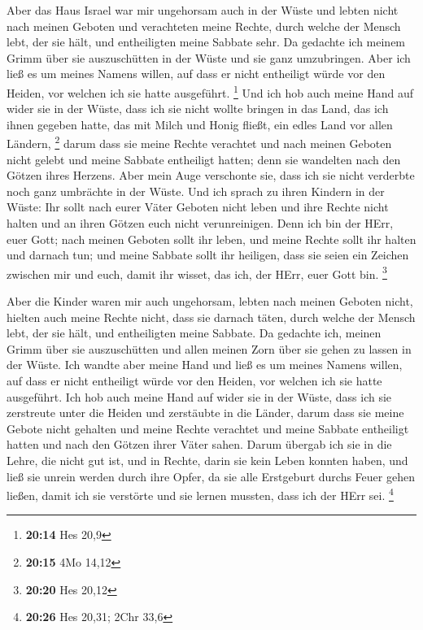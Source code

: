  Aber das Haus Israel war mir ungehorsam auch in der Wüste
und lebten nicht nach meinen Geboten und verachteten meine Rechte, durch
welche der Mensch lebt, der sie hält, und entheiligten meine Sabbate
sehr. Da gedachte ich meinem Grimm über sie auszuschütten in der Wüste
und sie ganz umzubringen.  Aber ich ließ es um meines
Namens willen, auf dass er nicht entheiligt würde vor den Heiden, vor
welchen ich sie hatte ausgeführt. \footnote{\textbf{20:14} Hes 20,9}
 Und ich hob auch meine Hand auf wider sie in der Wüste,
dass ich sie nicht wollte bringen in das Land, das ich ihnen gegeben
hatte, das mit Milch und Honig fließt, ein edles Land vor allen Ländern,
\footnote{\textbf{20:15} 4Mo 14,12}  darum dass sie meine
Rechte verachtet und nach meinen Geboten nicht gelebt und meine Sabbate
entheiligt hatten; denn sie wandelten nach den Götzen ihres Herzens.
 Aber mein Auge verschonte sie, dass ich sie nicht
verderbte noch ganz umbrächte in der Wüste.  Und ich sprach
zu ihren Kindern in der Wüste: Ihr sollt nach eurer Väter Geboten nicht
leben und ihre Rechte nicht halten und an ihren Götzen euch nicht
verunreinigen.  Denn ich bin der HErr, euer Gott; nach
meinen Geboten sollt ihr leben, und meine Rechte sollt ihr halten und
darnach tun;  und meine Sabbate sollt ihr heiligen, dass
sie seien ein Zeichen zwischen mir und euch, damit ihr wisset, das ich,
der HErr, euer Gott bin. \footnote{\textbf{20:20} Hes 20,12}

 Aber die Kinder waren mir auch ungehorsam, lebten nach
meinen Geboten nicht, hielten auch meine Rechte nicht, dass sie darnach
täten, durch welche der Mensch lebt, der sie hält, und entheiligten
meine Sabbate. Da gedachte ich, meinen Grimm über sie auszuschütten und
allen meinen Zorn über sie gehen zu lassen in der Wüste. 
Ich wandte aber meine Hand und ließ es um meines Namens willen, auf dass
er nicht entheiligt würde vor den Heiden, vor welchen ich sie hatte
ausgeführt.  Ich hob auch meine Hand auf wider sie in der
Wüste, dass ich sie zerstreute unter die Heiden und zerstäubte in die
Länder,  darum dass sie meine Gebote nicht gehalten und
meine Rechte verachtet und meine Sabbate entheiligt hatten und nach den
Götzen ihrer Väter sahen.  Darum übergab ich sie in die
Lehre, die nicht gut ist, und in Rechte, darin sie kein Leben konnten
haben,  und ließ sie unrein werden durch ihre Opfer, da sie
alle Erstgeburt durchs Feuer gehen ließen, damit ich sie verstörte und
sie lernen mussten, dass ich der HErr sei. \footnote{\textbf{20:26} Hes
  20,31; 2Chr 33,6}


